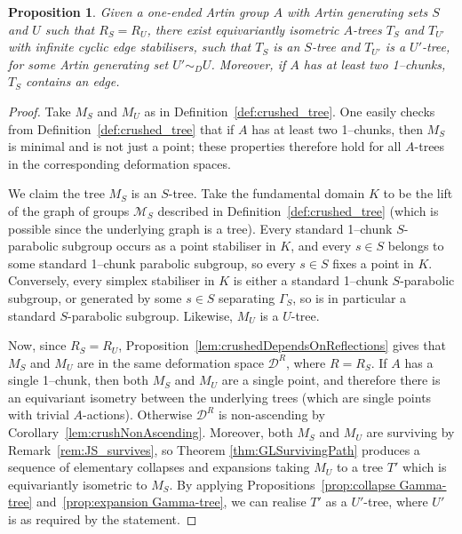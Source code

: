 \documentclass[svgnames]{amsart}
\theoremstyle{plain}
\newtheorem{prop}[thm]{Proposition}
\theoremstyle{definition}
\newcommand{\crush}[2]{\mathcal{#1}^{#2}}
\begin{document}
\begin{prop}\label{prop:zigzag}
    Given a one-ended Artin group $A$ with Artin generating sets $S$ and $U$ such that $R_S = R_U$, there exist equivariantly isometric $A$-trees $T_S$ and $T_{U'}$ with infinite cyclic edge stabilisers, such that $T_S$ is an $S$-tree and $T_{U'}$ is a $U'$-tree, for some Artin generating set $U'\sim_D U$. Moreover, if $A$ has at least two 1--chunks, $T_S$ contains an edge.
\end{prop}
\begin{proof}
    Take $M_S$ and $M_U$ as in Definition~\ref{def:crushed_tree}. One easily checks from Definition~\ref{def:crushed_tree} that if $A$ has at least two 1--chunks, then $M_S$ is minimal and is not just a point; these properties therefore hold for all $A$-trees in the corresponding deformation spaces.
    
    We claim the tree $M_S$ is an $S$-tree. Take the fundamental domain $K$ to be the lift of the graph of groups $\mathcal{M}_S$ described in Definition~\ref{def:crushed_tree} (which is possible since the underlying graph is a tree). Every standard 1--chunk $S$-parabolic subgroup occurs as a point stabiliser in $K$, and every $s\in S$ belongs to some standard 1--chunk parabolic subgroup, so every $s\in S$ fixes a point in $K$. Conversely, every simplex stabiliser in $K$ is either a standard 1--chunk $S$-parabolic subgroup, or generated by some $s\in S$ separating $\Gamma_S$, so is in particular a standard $S$-parabolic subgroup. Likewise, $M_U$ is a $U$-tree.

    Now, since $R_S = R_U$, Proposition~\ref{lem:crushedDependsOnReflections} gives that $M_S$ and $M_U$ are in the same deformation space $\crush D {R}$, where $R=R_S$. If $A$ has a single 1--chunk, then both $M_S$ and $M_U$ are a single point, and therefore there is an equivariant isometry between the underlying trees (which are single points with trivial $A$-actions). Otherwise $\crush D {R}$ is non-ascending by Corollary~\ref{lem:crushNonAscending}. Moreover, both $M_S$ and $M_U$ are surviving by Remark~\ref{rem:JS_survives}, so Theorem \ref{thm:GLSurvivingPath} produces a sequence of elementary collapses and expansions taking $M_U$ to a tree $T'$ which is equivariantly isometric to $M_S$. By applying Propositions~\ref{prop:collapse Gamma-tree} and~\ref{prop:expansion Gamma-tree}, we can realise $T'$ as a $U'$-tree, where $U'$ is as required by the statement.
\end{proof}
\end{document}

